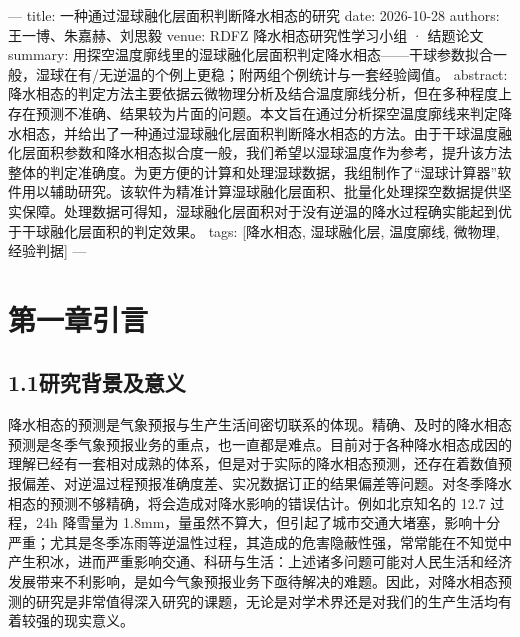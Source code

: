 ---
title: 一种通过湿球融化层面积判断降水相态的研究
date: 2026-10-28
authors: 王一博、朱嘉赫、刘思毅
venue: RDFZ 降水相态研究性学习小组 · 结题论文
summary: 用探空温度廓线里的湿球融化层面积判定降水相态——干球参数拟合一般，湿球在有/无逆温的个例上更稳；附两组个例统计与一套经验阈值。
abstract: 降水相态的判定方法主要依据云微物理分析及结合温度廓线分析，但在多种程度上存在预测不准确、结果较为片面的问题。本文旨在通过分析探空温度廓线来判定降水相态，并给出了一种通过湿球融化层面积判断降水相态的方法。由于干球温度融化层面积参数和降水相态拟合度一般，我们希望以湿球温度作为参考，提升该方法整体的判定准确度。为更方便的计算和处理湿球数据，我组制作了“湿球计算器”软件用以辅助研究。该软件为精准计算湿球融化层面积、批量化处理探空数据提供坚实保障。处理数据可得知，湿球融化层面积对于没有逆温的降水过程确实能起到优于干球融化层面积的判定效果。
tags: [降水相态, 湿球融化层, 温度廓线, 微物理, 经验判据]
---
\section*{第一章\quad 引言}

\subsection*{1.1\quad 研究背景及意义}

降水相态的预测是气象预报与生产生活间密切联系的体现。精确、及时的降水相态预测是冬季气象预报业务的重点，也一直都是难点。目前对于各种降水相态成因的理解已经有一套相对成熟的体系，但是对于实际的降水相态预测，还存在着数值预报偏差、对逆温过程预报准确度差、实况数据订正的结果偏差等问题。对冬季降水相态的预测不够精确，将会造成对降水影响的错误估计。例如北京知名的 12.7 过程，24h 降雪量为 1.8mm，量虽然不算大，但引起了城市交通大堵塞，影响十分严重；尤其是冬季冻雨等逆温性过程，其造成的危害隐蔽性强，常常能在不知觉中产生积冰，进而严重影响交通、科研与生活：上述诸多问题可能对人民生活和经济发展带来不利影响，是如今气象预报业务下亟待解决的难题。因此，对降水相态预测的研究是非常值得深入研究的课题，无论是对学术界还是对我们的生产生活均有着较强的现实意义。

